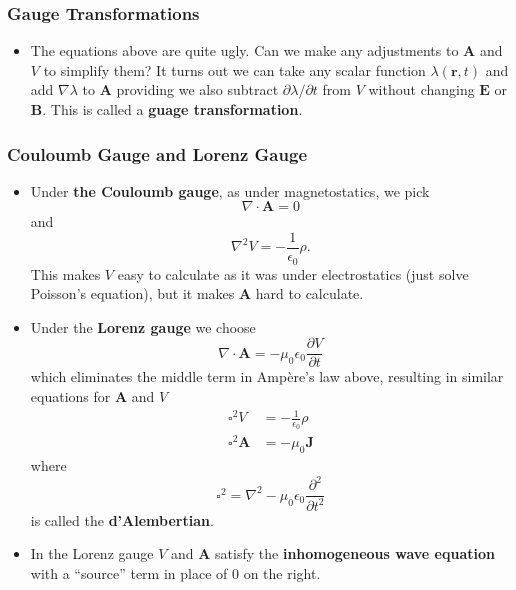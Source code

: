 \documentclass{article}
\renewcommand{\vec}[1]{\boldsymbol{\mathbf{#1}}}
\begin{document}
\subsubsection{Gauge Transformations}

\begin{itemize}
  \item The equations above are quite ugly. Can we make any adjustments to $\vec{A}$ and $V$ to simplify them? It turns out we can take any scalar function $\lambda(\vec{r}, t)$ and add $\nabla \lambda$ to $\vec{A}$ providing we also subtract $\partial \lambda / \partial t$ from $V$ without changing $\vec{E}$ or $\vec{B}$. This is called a \textbf{guage transformation}.
\end{itemize}

\subsubsection{Couloumb Gauge and Lorenz Gauge}

\begin{itemize}
  \item Under \textbf{the Couloumb gauge}, as under magnetostatics, we pick \[\nabla \cdot \vec{A} = 0\] and \[\nabla^2 V = -\frac{1}{\epsilon_0} \rho.\] This makes $V$ easy to calculate as it was under electrostatics (just solve Poisson's equation), but it makes $\vec{A}$ hard to calculate.

  \item Under the \textbf{Lorenz gauge} we choose \[\nabla \cdot \vec{A} = -\mu_0 \epsilon_0 \frac{\partial V}{\partial t}\] which eliminates the middle term in Ampère's law above, resulting in similar equations for $\vec{A}$ and $V$ \begin{align*}
          \square^2 V       & = -\frac{1}{\epsilon_0} \rho \\
          \square^2 \vec{A} & = -\mu_0 \vec{J}
        \end{align*} where \[\square^2 = \nabla^2 - \mu_0 \epsilon_0 \frac{\partial^2}{\partial t^2}\] is called the \textbf{d'Alembertian}.

  \item In the Lorenz gauge $V$ and $\vec{A}$ satisfy the \textbf{inhomogeneous wave equation} with a ``source'' term in place of $0$ on the right.
\end{itemize}
\end{document}
